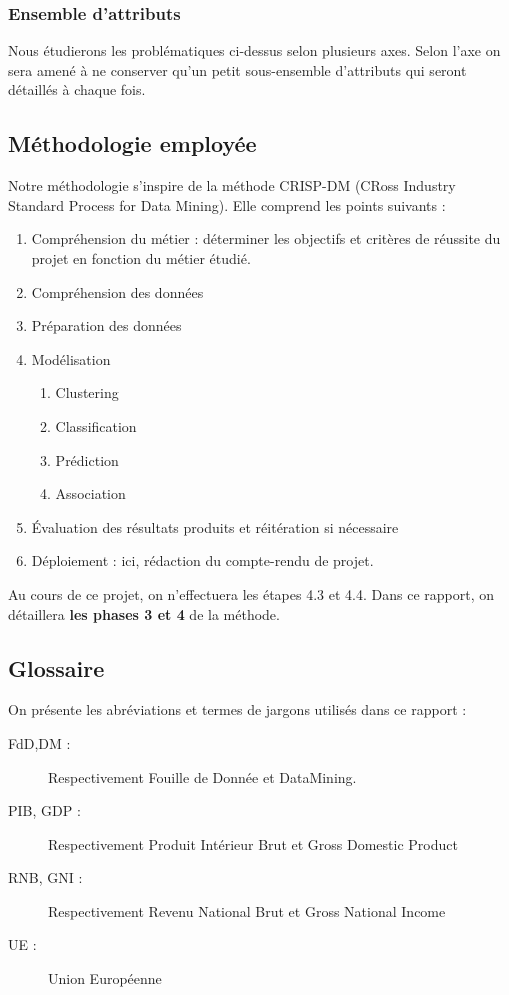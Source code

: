 \subsubsection{Ensemble d'attributs}
Nous étudierons les problématiques ci-dessus selon plusieurs axes. Selon
l'axe on sera amené à ne conserver qu'un petit sous-ensemble d'attributs
qui seront détaillés à chaque fois.


\subsection{Méthodologie employée}

Notre méthodologie s'inspire de la méthode CRISP-DM (CRoss Industry
Standard Process for Data Mining). Elle comprend les points suivants :

\begin{enumerate}
\item Compréhension du métier : déterminer les objectifs et critères de
réussite du projet en fonction du métier étudié.
\item Compréhension des données
\item Préparation des données
\item Modélisation
    \begin{enumerate}
    \item Clustering
    \item Classification 
    \item Prédiction
    \item Association
    \end{enumerate}
\item Évaluation des résultats produits et réitération si nécessaire
\item Déploiement : ici, rédaction du compte-rendu de projet.
\end{enumerate}

Au cours de ce projet, on n'effectuera les étapes 4.3 et 4.4.
Dans ce rapport, on détaillera \textbf{les phases 3 et 4} de la méthode. 


\subsection{Glossaire}

On présente les abréviations et termes de jargons utilisés dans ce rapport
:

\begin{description}
\item[FdD,DM : ] Respectivement Fouille de Donnée et DataMining.
\item[PIB, GDP : ] Respectivement Produit Intérieur Brut et Gross Domestic
Product
\item[RNB, GNI : ] Respectivement Revenu National Brut et Gross National
Income
\item[UE : ] Union Européenne
\end{description}
